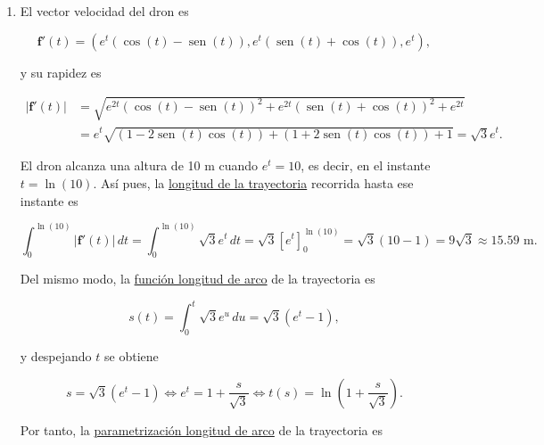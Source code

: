 \documentclass[
  spanish,
  a4paper,
]{scrreport}
\theoremstyle{definition}
\theoremstyle{remark}
\begin{document}
\begin{tcolorbox}[enhanced jigsaw, arc=.35mm, bottomrule=.15mm, bottomtitle=1mm, breakable, colback=white, colbacktitle=quarto-callout-tip-color!10!white, colframe=quarto-callout-tip-color-frame, coltitle=black, left=2mm, leftrule=.75mm, opacityback=0, opacitybacktitle=0.6, rightrule=.15mm, title=\textcolor{quarto-callout-tip-color}{\faLightbulb}\hspace{0.5em}{Solución}, titlerule=0mm, toprule=.15mm, toptitle=1mm]

\begin{enumerate}
\def\labelenumi{\alph{enumi}.}
\item
  El vector velocidad del dron es

  \[
  \mathbf{f}'(t) = \left(e^t(\cos(t)-\operatorname{sen}(t)), e^t(\operatorname{sen}(t)+\cos(t)), e^t\right),
  \]

  y su rapidez es

  \begin{align*}
  |\mathbf{f}'(t)|
  &= \sqrt{e^{2t}(\cos(t)-\operatorname{sen}(t))^2 + e^{2t}(\operatorname{sen}(t)+\cos(t))^2 + e^{2t}} \\
  &= e^t\sqrt{(1-2\operatorname{sen}(t)\cos(t)) + (1+2\operatorname{sen}(t)\cos(t)) + 1}
  = \sqrt{3}e^t.
  \end{align*}

  El dron alcanza una altura de 10 m cuando \(e^t = 10\), es decir, en
  el instante \(t=\ln(10)\). Así pues, la
  \href{https://aprendeconalf.es/analisis-manual/12-funciones-vectoriales.html\#def-longitud-trayectoria-funcion-vectorial}{longitud
  de la trayectoria} recorrida hasta ese instante es

  \[
  \int_0^{\ln(10)} |\mathbf{f}'(t)|\,dt
  = \int_0^{\ln(10)} \sqrt{3}e^t\,dt
  = \sqrt{3}\left[e^t\right]_0^{\ln(10)}
  = \sqrt{3}(10-1) = 9\sqrt{3} \approx 15.59 \text{ m}.
  \]

  Del mismo modo, la
  \href{https://aprendeconalf.es/analisis-manual/12-funciones-vectoriales.html\#def-funcion-longitud-arco}{función
  longitud de arco} de la trayectoria es

  \[
  s(t) = \int_0^t \sqrt{3}e^u\,du = \sqrt{3}(e^t-1),
  \]

  y despejando \(t\) se obtiene

  \[
  s = \sqrt{3}(e^t-1) \Leftrightarrow e^t = 1 + \frac{s}{\sqrt{3}} \Leftrightarrow t(s) = \ln\left(1+\frac{s}{\sqrt{3}}\right).
  \]

  Por tanto, la
  \href{https://aprendeconalf.es/analisis-manual/12-funciones-vectoriales.html\#def-parametrizacion-longitud-arco-funcion-vectorial}{parametrización
  longitud de arco} de la trayectoria es


\end{enumerate}
\end{tcolorbox}
\end{document}

